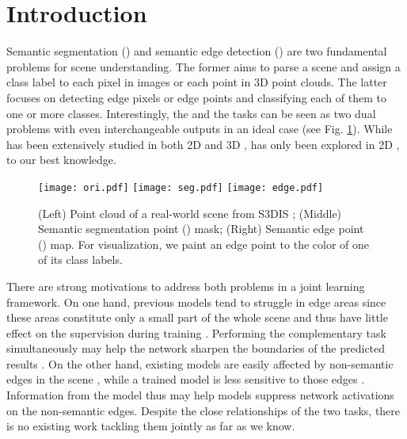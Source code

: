 \documentclass[runningheads]{llncs}
\begin{document}
\section{Introduction}

Semantic segmentation {(\SemSeg)} and semantic edge detection {(\SemEdgeD)} are two fundamental problems for scene understanding. The former aims to parse a scene and assign a class label to each pixel in images or each point in 3D point clouds. The latter focuses on detecting edge pixels or edge points and classifying each of them to one or more classes. Interestingly, the {\SemSeg} and the {\SemEdgeD} tasks can be seen as two dual problems with even interchangeable outputs in an ideal case (see Fig. \ref{fig:example}). While {\SemSeg} has been extensively studied in both 2D and 3D \cite{long2015fully,takikawa2019gated,li2018pointcnn,jaritz2019multi,qi2017pointnet,qi2017pointnet++,dai2017scannet}, {\SemEdgeD} has only been explored in 2D  \cite{yu2017casenet,liu2018semantic,yu2018simultaneous,acuna2019devil}, to our best knowledge. 

\begin{figure}[htp]

\centering
\texttt{[image: ori.pdf]}\hfill
\texttt{[image: seg.pdf]}\hfill
\texttt{[image: edge.pdf]}

\caption{(Left) Point cloud {of a real-world scene from S3DIS \cite{armeni_cvpr16}}; (Middle) Semantic segmentation point (\SemSegPoint) mask; (Right) Semantic edge point (\SemEdgePoint) map. {For visualization, we paint an edge point to the color of one of its class labels.}
}
\label{fig:example}

\end{figure}

There are strong motivations to address both problems in a joint learning framework. On one hand, previous {\SemSeg} models tend to struggle in edge areas since these areas constitute only a small part of the whole scene and thus have little effect on the supervision during training  \cite{zhao2017pyramid,lin2017refinenet}. Performing the complementary {\SemEdgeD} task simultaneously may help the network sharpen the boundaries of the predicted {\SemSeg} results \cite{wu2019stacked}. On the other hand, existing {\SemEdgeD} models are easily affected by non-semantic edges in the scene \cite{yu2017casenet,acuna2019devil}, while a trained {\SemSeg} model is less sensitive to those edges \cite{yu2018learning}. Information from the {\SemSeg} model {thus} may help {\SemEdgeD} models suppress network activations on the non-semantic edges. Despite the close relationships of the two tasks, there is no existing work tackling them jointly as far as we know.
\end{document}
